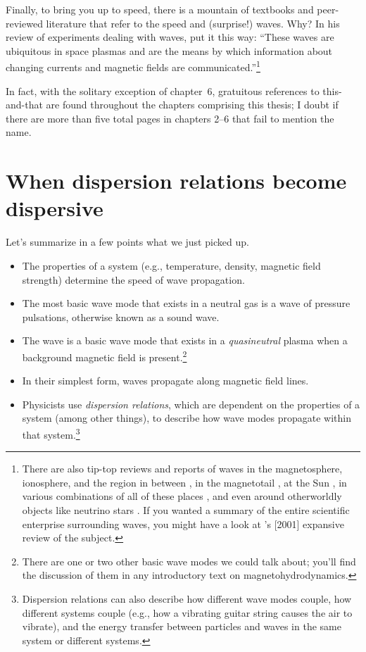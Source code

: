 Finally, to bring you up to speed, there is a mountain of
textbooks and peer-reviewed literature that refer to the \Alf speed and
(surprise!) \Alf waves. Why? In his review of experiments dealing with \Alf
waves, \cite{Gekelman1999} put it this way: ``These waves are ubiquitous in
space plasmas and are the means by which information about changing currents and
magnetic fields are communicated.''\footnote{There are also tip-top reviews and
  reports of \Alf waves in the magnetosphere, ionosphere, and the region in
  between \citep{Stasiewicz2000,Berthomier2011,Mottez2015}, in the magnetotail
  \citep{Keiling2009}, at the Sun \citep{Mathioudakis2013}, in various
  combinations of all of these places \citep{Wu2016a}, and even around
  otherworldly objects like neutrino stars \citep{Thompson1996}. If you wanted a
  summary of the entire scientific enterprise surrounding \Alf waves, you might
  have a look at \citeauthor{Cramer2001}'s [2001] expansive review of the
  subject.}

In fact, with the solitary exception of chapter~6, gratuitous references to \Alf
this-and-that are found throughout the chapters comprising this thesis; I doubt
if there are more than five total pages in chapters 2--6 that fail to mention
the name.

\section[When dispersion relations become dispersive]{When dispersion relations
  become dispersive}

Let's summarize in a few points what we just picked up.
\begin{itemize}
\item The properties of a system (e.g., temperature, density, magnetic field
  strength) determine the speed of wave propagation.
\item The most basic wave mode that exists in a neutral gas is a wave of
  pressure pulsations, otherwise known as a sound wave.
\item The \Alf wave is a basic wave mode that exists in a \textsl{quasineutral}
  plasma when a background magnetic field is present.\footnote{There are one or
    two other basic wave modes we could talk about; you'll find the discussion
    of them in any introductory text on magnetohydrodynamics.}
\item In their simplest form, \Alf waves propagate along magnetic field lines.
\item Physicists use \textsl{dispersion relations}, which are dependent on the
  properties of a system (among other things), to describe how wave modes
  propagate within that system.\footnote{Dispersion relations can also describe
    how different wave modes couple, how different systems couple (e.g., how a
    vibrating guitar string causes the air to vibrate), and the energy transfer
    between particles and waves in the same system or different systems.}
\end{itemize}

